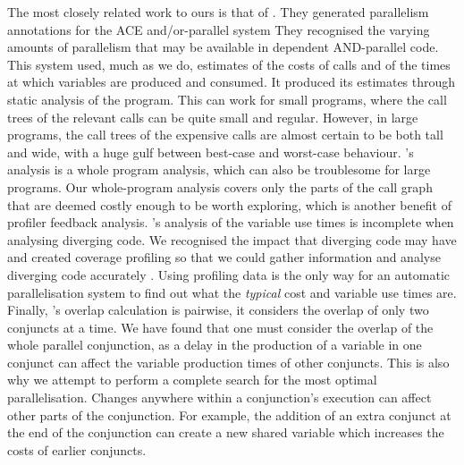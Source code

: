 The most closely related work to ours is that of
\citet*{Pontelli97automaticcompile-time}.
They generated parallelism annotations for the ACE and/or-parallel system
They recognised the varying amounts of parallelism that may be available in
dependent AND-parallel code.
This system used, much as we do,
estimates of the costs of calls
and of the times at which variables are produced and consumed.
It produced its estimates through static analysis of the program.
This can work for small programs,
where the call trees of the relevant calls can be quite small and regular.
However, in large programs, the call trees of the expensive calls
are almost certain to be both tall and wide,
with a huge gulf between best-case and worst-case behaviour.
\citeauthor{Pontelli97automaticcompile-time}'s analysis is a whole program
analysis,
which can also be troublesome for large programs.
Our whole-program analysis covers only the parts of the call graph that are
deemed costly enough to be worth exploring,
which is another benefit of profiler feedback analysis.
\citeauthor{Pontelli97automaticcompile-time}'s analysis of the variable use
times is incomplete when analysing diverging code.
We recognised the impact that diverging code may have and created coverage
profiling so that we could gather information and analyse diverging code
accurately \citep{bone:2008:hons}.
Using profiling data is the only way
for an automatic parallelisation system to find out
what the \emph{typical} cost and variable use times are.
Finally, \citeauthor{Pontelli97automaticcompile-time}'s overlap calculation is
pairwise, it considers the overlap of only two conjuncts at a time.
We have found that one must consider the overlap of the whole parallel
conjunction, as a delay in the production of a variable in one conjunct can
affect the variable production times of other conjuncts.
This is also why we attempt to perform a complete search for the most optimal
parallelisation.
Changes anywhere within a conjunction's execution can affect other parts of
the conjunction.
For example,
the addition of an extra conjunct at the end of the conjunction can create a
new shared variable which increases the costs of earlier conjuncts.


